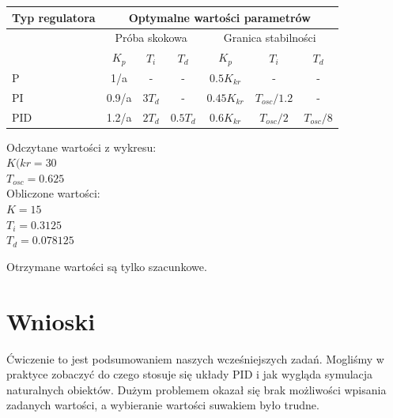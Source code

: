 \documentclass[a4paper,10pt]{article}
\begin{document}
\begin{enumerate}
\begin{tabular}{ | l | c | c | c | c | c | c | }
\hline
  Typ regulatora & \multicolumn{6}{|c|}{Optymalne wartości parametrów} \\   \hline
   & \multicolumn{3}{|c|}{Próba skokowa} & \multicolumn{3}{|c|}{Granica stabilności} \\   \hline
   & $K_{p}$ & $T_{i}$ & $T_{d}$ & $K_{p}$ & $T_{i}$ & $T_{d}$\\   \hline
   P & 1/a & - & - & $0.5K_{kr}$ & - & - \\   \hline
   PI & 0.9/a & $3 T_{d}$ & - & $0.45K_{kr}$ & $T_{osc}/1.2$ & - \\   \hline
   PID & 1.2/a & $2T_{d}$ & $0.5T_d$ & $0.6K_{kr}$ & $T_{osc}/2$ & $T_{osc}/8$ \\   \hline
\hline
\end{tabular}
\newline

Odczytane wartości z wykresu:\\
$K({kr}=30$\\
$T_{osc}=0.625$\\
Obliczone wartości:\\
$K=15$\\
$T_{i}=0.3125$\\
$T_{d}=0.078125$\\
\end{enumerate}
Otrzymane wartości są tylko szacunkowe.

\section{Wnioski}
Ćwiczenie to jest podsumowaniem naszych wcześniejszych zadań. Mogliśmy w praktyce zobaczyć do czego stosuje się układy PID i jak wygląda symulacja naturalnych obiektów. Dużym problemem okazał się brak możliwości wpisania zadanych wartości, a wybieranie wartości suwakiem było trudne.
\end{document}
